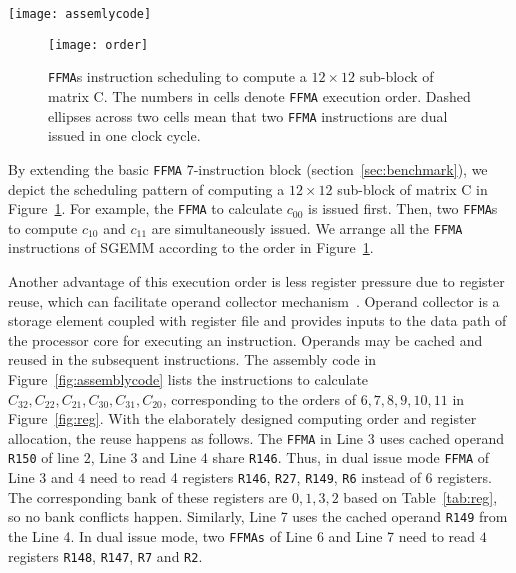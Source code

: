 \begin{figure*}[htbp]
\begin{center}
\texttt{[image: assemlycode]}
    \caption{The comparison of compiler generated codes and our tuned assembly codes.}
\label{fig:assemblycode}
\end{center}
\end{figure*}

\begin{figure}[htbp]
\begin{center}
\texttt{[image: order]}
\caption{{\tt FFMA}s instruction scheduling to compute a $12\times 12$ sub-block of matrix C.  The numbers in 
cells denote {\tt FFMA} execution order. Dashed ellipses across two cells mean that two {\tt FFMA} instructions are dual issued in one clock cycle. }
\label{fig:order}
\end{center}
\end{figure}

By extending the basic {\tt FFMA} $7$-instruction block (section~\ref{sec:benchmark}), we depict the scheduling pattern of computing a $12\times 12$ sub-block of matrix C in Figure~\ref{fig:order}.
For example, the {\tt FFMA} to calculate $c_{00}$ is issued first. 
Then, two {\tt FFMA}s to
compute $c_{10}$ and $c_{11}$ are simultaneously issued. We arrange all the {\tt FFMA} instructions of SGEMM according to the order in Figure~\ref{fig:order}.

Another advantage of this execution order is less register pressure due to register reuse, which can facilitate
operand collector mechanism~\cite{collector}. Operand collector is a storage element coupled with register file and
provides inputs to the data path of the processor core for executing an instruction.  Operands may be cached and reused
in the subsequent instructions. 
The assembly code in Figure~\ref{fig:assemblycode} lists the instructions to calculate $C_{32},C_{22}, C_{21}, C_{30}, 
C_{31}, C_{20}$, corresponding to the orders of $6,7,8,9,10,11$ in Figure~\ref{fig:reg}. 
With the elaborately designed computing order and register allocation, the reuse happens as follows. The {\tt FFMA} in 
Line $3$ uses cached operand {\tt R150} of line $2$, Line $3$ and Line $4$ share {\tt R146}. Thus, in dual issue mode 
{\tt FFMA} of Line $3$ and $4$ need to read 4 registers {\tt R146}, {\tt R27}, {\tt R149}, {\tt R6} instead of $6$ 
registers. The corresponding bank of these registers are $0,1,3,2$ based on Table~\ref{tab:reg}, so no bank conflicts happen.
Similarly, Line 7 uses the cached operand {\tt R149} from the Line 4. In dual issue mode, two {\tt FFMAs} of Line 6 and 
Line 7 need to read $4$ registers {\tt R148}, {\tt R147}, {\tt R7} and {\tt R2}.

